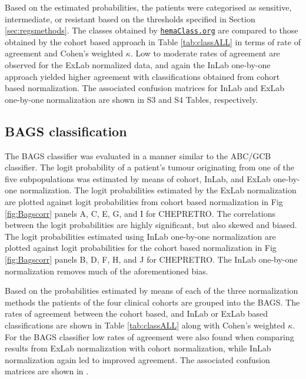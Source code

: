 \documentclass[10pt,letterpaper]{article}
\newcommand{\hemaClass}{\href{http://hemaClass.org}{\texttt{hemaClass.org}}}
\begin{document}
Based on the estimated probabilities, the patients were categorised as sensitive, intermediate, or resistant based on the thresholds specified in Section \ref{sec:regsmethods}.
The classes obtained by \hemaClass{} are compared to those obtained by the cohort based approach in Table \ref{tab:classALL} in terms of rate of agreement and Cohen's weighted $\kappa$. Low to moderate rates of agreement are observed for the ExLab normalized data, and again the InLab one-by-one approach yielded higher agreement with classifications obtained from cohort based normalization. 
The associated confusion matrices for InLab and ExLab one-by-one normalization are shown in S3 and S4 Tables, respectively.


\subsection*{BAGS classification}
The BAGS classifier was evaluated in a manner similar to the ABC/GCB classifier.
The logit probability of a patient's tumour originating from one of the five subpopulations was estimated by means of cohort, InLab, and ExLab one-by-one normalization.
The logit probabilities estimated by the ExLab normalization are plotted against logit probabilities from cohort based normalization in Fig \ref{fig:Bagscorr} panels A, C, E, G, and I for CHEPRETRO.
The correlations between the logit probabilities are highly significant, but also skewed and biased.
The logit probabilities estimated using InLab one-by-one normalization are plotted against logit probabilities for the cohort based normalization in Fig \ref{fig:Bagscorr} panels B, D, F, H, and J for CHEPRETRO.
The InLab one-by-one normalization removes much of the aforementioned bias.

Based on the probabilities estimated by means of each of the three normalization methods the patients of the four clinical cohorts are grouped into the BAGS.
The rates of agreement between the cohort based, and InLab or ExLab based classifications are shown in Table \ref{tab:classALL} along with Cohen's weighted $\kappa$. For the BAGS classifier low rates of agreement were also found when comparing results from ExLab normalization with cohort normalization, while InLab normalization again led to improved agreement. 
The associated confusion matrices are shown in .
\end{document}
